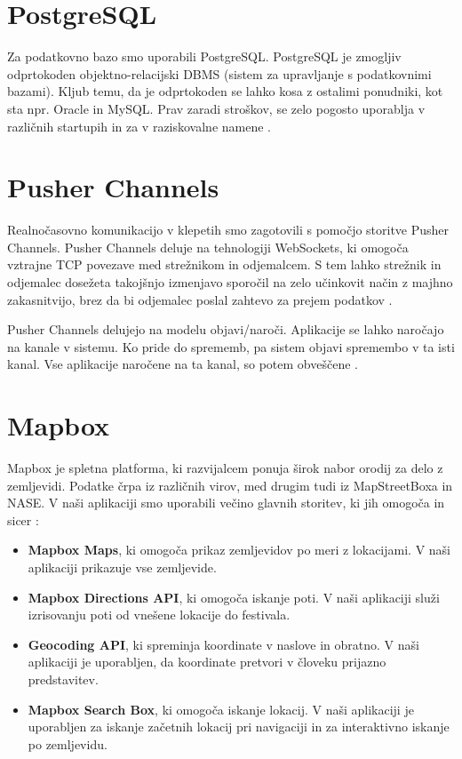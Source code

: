\documentclass[a4paper,12pt,openright]{book}
\begin{document}
\section{PostgreSQL}
Za podatkovno bazo smo uporabili PostgreSQL. PostgreSQL je zmogljiv odprtokoden objektno-relacijski DBMS (sistem za upravljanje s podatkovnimi bazami). Kljub temu, da je
odprtokoden se lahko kosa z ostalimi ponudniki, kot sta npr. Oracle in MySQL. Prav zaradi stroškov, se zelo pogosto uporablja v različnih startupih in za v 
raziskovalne namene \cite{juba2015learning}.

\section{Pusher Channels}
Realnočasovno komunikacijo v klepetih smo zagotovili s pomočjo storitve Pusher Channels. Pusher Channels deluje na tehnologiji WebSockets, ki omogoča vztrajne TCP povezave
med strežnikom in odjemalcem. S tem lahko strežnik in odjemalec dosežeta takojšnjo izmenjavo sporočil na zelo učinkovit način z majhno zakasnitvijo, brez da bi odjemalec
poslal zahtevo za prejem podatkov \cite{websockets}.

Pusher Channels delujejo na modelu objavi/naroči. Aplikacije se lahko naročajo na kanale v sistemu. Ko pride do sprememb, pa sistem objavi spremembo v ta isti kanal.
Vse aplikacije naročene na ta kanal, so potem obveščene \cite{pusher}.

\section{Mapbox}
Mapbox je spletna platforma, ki razvijalcem ponuja širok nabor orodij za delo z zemljevidi. Podatke črpa iz različnih virov, med drugim tudi iz MapStreetBoxa in NASE. 
V naši aplikaciji smo uporabili večino glavnih storitev, ki jih omogoča in sicer \cite{mapboxservices}:
\begin{itemize}
    \item \textbf{Mapbox Maps}, ki omogoča prikaz zemljevidov po meri z lokacijami. V naši aplikaciji prikazuje vse zemljevide.
    \item \textbf{Mapbox Directions API}, ki omogoča iskanje poti. V naši aplikaciji služi izrisovanju poti od vnešene lokacije do festivala.
    \item \textbf{Geocoding API}, ki spreminja koordinate v naslove in obratno. V naši aplikaciji je uporabljen, da koordinate pretvori v človeku prijazno predstavitev.
    \item \textbf{Mapbox Search Box}, ki omogoča iskanje lokacij. V naši aplikaciji je uporabljen za iskanje začetnih lokacij pri navigaciji in za interaktivno iskanje po zemljevidu.
\end{itemize}
\end{document}
